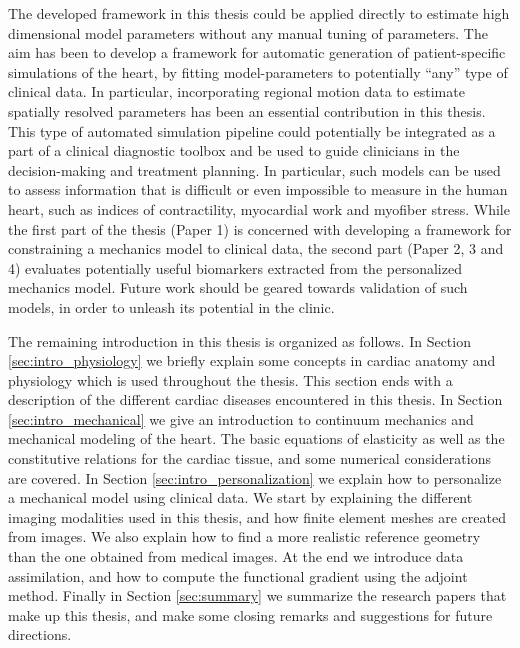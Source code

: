 The developed framework in this thesis could be applied directly to
estimate high dimensional model parameters without any manual tuning of
parameters. The aim has been to develop a framework for automatic
generation of patient-specific simulations of the heart, by fitting
model-parameters to potentially ``any'' type of clinical data. In particular,
incorporating regional motion data to estimate spatially resolved
parameters has been an essential contribution in this thesis. This
type of automated simulation pipeline could potentially be integrated
as a part of a clinical diagnostic toolbox and be used to guide clinicians in the
decision-making and treatment planning. In particular, such models can
be used to assess information that is difficult or even impossible to
measure in the human heart, such as indices of contractility,
myocardial work and myofiber stress. While the first part of the
thesis (Paper 1) is concerned with developing a framework for
constraining a mechanics model to clinical data, the second part
(Paper 2, 3 and 4) evaluates potentially useful biomarkers extracted from
the personalized mechanics model. Future work should be geared towards
validation of such models, in order to unleash its potential in the
clinic.

The remaining introduction in this thesis is organized as follows. In
Section \ref{sec:intro_physiology} we briefly explain some concepts in
cardiac anatomy and physiology which is used throughout the
thesis. This section ends with a description of the different cardiac
diseases encountered in this thesis. In Section
\ref{sec:intro_mechanical} we give an introduction to continuum
mechanics and mechanical modeling of the heart. The basic equations of
elasticity as well as the constitutive relations for the cardiac
tissue, and some numerical considerations are covered. In Section 
\ref{sec:intro_personalization} we explain how to personalize a
mechanical model using clinical data. We start by explaining the
different imaging modalities used in this thesis, and how finite
element meshes are created from images. We also explain how to find a
more realistic reference geometry than the one obtained from medical
images. At the end we introduce data assimilation, and how to compute
the functional gradient using the adjoint method. Finally in Section
\ref{sec:summary} we summarize the research papers that make up this
thesis, and make some closing remarks and suggestions for future
directions. 

\newpage



